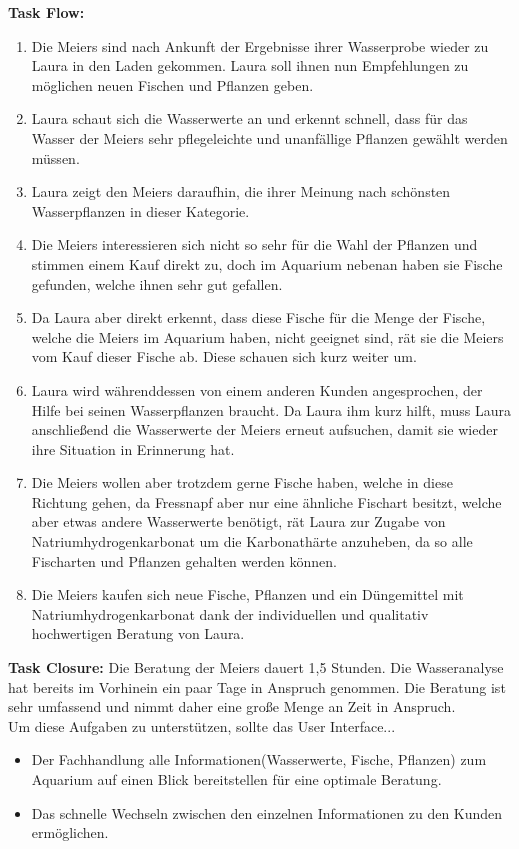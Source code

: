 \textbf{Task Flow:}
\begin{enumerate}
\item Die Meiers sind nach Ankunft der Ergebnisse ihrer Wasserprobe wieder zu Laura in den Laden gekommen. Laura soll ihnen nun Empfehlungen zu möglichen neuen Fischen und Pflanzen geben.
\item Laura schaut sich die Wasserwerte an und erkennt schnell, dass für das Wasser der Meiers sehr pflegeleichte und unanfällige Pflanzen gewählt werden müssen. 
\item Laura zeigt den Meiers daraufhin, die ihrer Meinung nach schönsten Wasserpflanzen in dieser Kategorie. 
\item Die Meiers interessieren sich nicht so sehr für die Wahl der Pflanzen und stimmen einem Kauf direkt zu, doch im Aquarium nebenan haben sie Fische gefunden, welche ihnen sehr gut gefallen.
\item Da Laura aber direkt erkennt, dass diese Fische für die Menge der Fische, welche die Meiers im Aquarium haben, nicht geeignet sind, rät sie die Meiers vom Kauf dieser Fische ab. Diese schauen sich kurz weiter um.
\item Laura wird währenddessen von einem anderen Kunden angesprochen, der Hilfe bei seinen Wasserpflanzen braucht. Da Laura ihm kurz hilft, muss Laura anschließend die Wasserwerte der Meiers erneut aufsuchen, damit sie wieder ihre Situation in Erinnerung hat.
\item Die Meiers wollen aber trotzdem gerne Fische haben, welche in diese Richtung gehen, da Fressnapf aber nur eine ähnliche Fischart besitzt, welche aber etwas andere Wasserwerte benötigt, rät Laura zur Zugabe von Natriumhydrogenkarbonat um die Karbonathärte anzuheben, da so alle Fischarten und Pflanzen gehalten werden können.
\item Die Meiers kaufen sich neue Fische, Pflanzen und ein Düngemittel mit Natriumhydrogenkarbonat dank der individuellen und qualitativ hochwertigen Beratung von Laura.
\end{enumerate}

\textbf{Task Closure:} Die Beratung der Meiers dauert 1,5 Stunden. Die Wasseranalyse hat bereits im Vorhinein ein paar Tage in Anspruch genommen. Die Beratung ist sehr umfassend und nimmt daher eine große Menge an Zeit in Anspruch.\\

Um diese Aufgaben zu unterstützen, sollte das User Interface...
\begin{itemize}
  \item Der Fachhandlung alle Informationen(Wasserwerte, Fische, Pflanzen) zum Aquarium auf einen Blick bereitstellen für eine optimale Beratung.
  \item Das schnelle Wechseln zwischen den einzelnen Informationen zu den Kunden ermöglichen.
\end{itemize}

